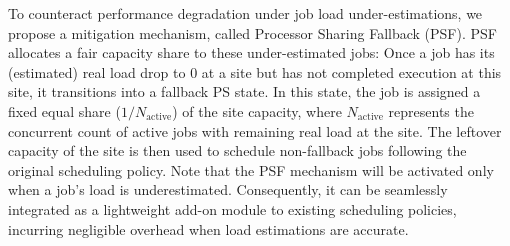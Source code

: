 To counteract performance degradation under job load under-estimations, we propose a mitigation mechanism, called Processor Sharing Fallback (PSF). PSF allocates a fair capacity share to these under-estimated jobs: Once a job has its (estimated) real load drop to 0 at a site but has not completed execution at this site, it transitions into a fallback PS state. In this state, the job is assigned a fixed equal share ($1/N_{\text{active}}$) of the site capacity, where $N_{\text{active}}$ represents the concurrent count of active jobs with remaining real load at the site. The leftover capacity of the site is then used to schedule non-fallback jobs following the original scheduling policy. Note that the PSF mechanism will be activated only when a job's load is underestimated. Consequently, it can be seamlessly integrated as a lightweight add-on module to existing scheduling policies, incurring negligible overhead when load estimations are accurate.%


\begin{table}[ht]
\centering
\caption{Number of jobs violating PS deadlines with/without PSF, 10\% deviation, 70\% utilization, Alibaba 2017}
\label{tab:PSF_ali17_1}
\end{table}

